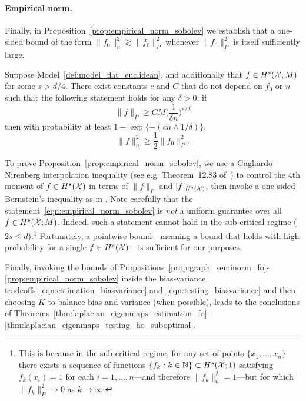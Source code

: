 \paragraph{Empirical norm.}
Finally, in Proposition~\ref{prop:empirical_norm_sobolev} we establish that a one-sided bound of the form $\|f_0\|_n^2 \gtrsim \|f_0\|_P^2$ whenever $\|f_0\|_P^2$ is itself sufficiently large.
\begin{proposition}
	\label{prop:empirical_norm_sobolev}
	Suppose Model~\ref{def:model_flat_euclidean}, and additionally that $f \in H^s(\mathcal{X},M)$ for some $s > d/4$. There exist constants $c$ and $C$ that do not depend on $f_0$ or $n$ such that the following statement holds for any $\delta > 0$:  if
	\begin{equation}
	\label{eqn:empirical_norm_sobolev_1}
	\|f\|_{P} \geq C M \biggl(\frac{1}{\delta n}\biggr)^{s/d}
	\end{equation}
	then with probability at least $1 - \exp\{-(cn \wedge 1/\delta)\}$,
	\begin{equation}
	\label{eqn:empirical_norm_sobolev}
	\|f\|_n^2 \geq \frac{1}{2} \|f_0\|_P^2.
	\end{equation}
\end{proposition}
To prove Proposition~\ref{prop:empirical_norm_sobolev}, we use a Gagliardo-Nirenberg interpolation inequality (see e.g. Theorem~12.83 of~\citep{leoni2017}) to control the $4$th moment of $f \in H^s(\mathcal{X})$ in terms of $\|f\|_P$ and $|f|_{H^s(\mathcal{X})}$, then invoke a one-sided Bernstein's inequality as in \cite[Section 14.2]{wainwright2019}. Note carefully that the statement~\eqref{eqn:empirical_norm_sobolev} is \emph{not} a uniform guarantee over all $f \in H^s(\mathcal{X};M)$. Indeed, such a statement cannot hold in the sub-critical regime ($2s \leq d$).\footnote{This is because in the sub-critical regime, for any set of points $\{x_1,\ldots,x_n\}$ there exists a sequence of functions $\{f_k:k \in \mathbb{N}\} \subset H^s(\mathcal{X};1)$ satisfying $f_k(x_i) = 1$ for each $i = 1,\ldots,n$---and therefore $\|f_k\|_n^2 = 1$---but for which $\|f_k\|_P^2 \to 0$ as $k \to \infty$.} Fortunately, a pointwise bound---meaning a bound that holds with high probability for a single $f \in H^s(\mathcal{X})$---is sufficient for our purposes.

Finally, invoking the bounds of Propositions~\ref{prop:graph_seminorm_fo}-\ref{prop:empirical_norm_sobolev} inside the bias-variance tradeoffs~\eqref{eqn:estimation_biasvariance} and~\eqref{eqn:testing_biasvariance} and then choosing $K$ to balance bias and variance (when possible), leads to the conclusions of Theorems~\ref{thm:laplacian_eigenmaps_estimation_fo}-\ref{thm:laplacian_eigenmaps_testing_ho_suboptimal}.

